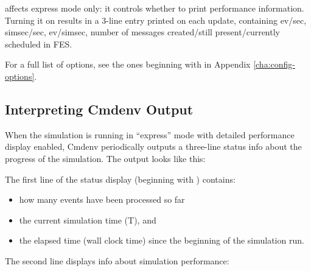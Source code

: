  affects express mode only: it controls
whether to print performance information. Turning it on results in a 3-line
entry printed on each update, containing ev/sec, simsec/sec, ev/simsec,
number of messages created/still present/currently scheduled in FES.

For a full list of options, see the ones beginning with  in
Appendix \ref{cha:config-options}.


\subsection{Interpreting Cmdenv Output}
\label{sec:ch-run-sim:interpreting-cmdenv-output}

When the simulation is running in ``express'' mode with detailed
performance display enabled, Cmdenv periodically outputs a three-line
status info about the progress of the simulation.
The output looks like this:


The first line of the status display (beginning with \ttt{**})
contains:

\begin{itemize}
   \item{how many events have been processed so far}
   \item{the current simulation time (T), and}
   \item{the elapsed time (wall clock time) since the beginning of the simulation run.}
\end{itemize}

The second line displays info about simulation performance:


